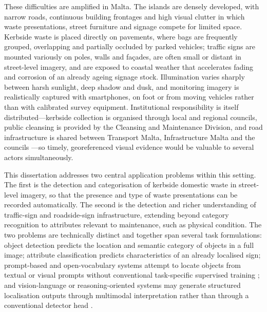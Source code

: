These difficulties are amplified in Malta. The islands are densely developed, with narrow roads, continuous building frontages and high visual clutter in which waste presentations, street furniture and signage compete for limited space. Kerbside waste is placed directly on pavements, where bags are frequently grouped, overlapping and partially occluded by parked vehicles; traffic signs are mounted variously on poles, walls and fa\c{c}ades, are often small or distant in street-level imagery, and are exposed to coastal weather that accelerates fading and corrosion of an already ageing signage stock. Illumination varies sharply between harsh sunlight, deep shadow and dusk, and monitoring imagery is realistically captured with smartphones, on foot or from moving vehicles rather than with calibrated survey equipment. Institutional responsibility is itself distributed---kerbside collection is organised through local and regional councils, public cleansing is provided by the Cleansing and Maintenance Division, and road infrastructure is shared between Transport Malta, Infrastructure Malta and the councils \citep{wastecollection2026web,cmd2026web,localcouncilsact1993}---so timely, georeferenced visual evidence would be valuable to several actors simultaneously.

This dissertation addresses two central application problems within this setting. The first is the detection and categorisation of kerbside domestic waste in street-level imagery, so that the presence and type of waste presentations can be recorded automatically. The second is the detection and richer understanding of traffic-sign and roadside-sign infrastructure, extending beyond category recognition to attributes relevant to maintenance, such as physical condition. The two problems are technically distinct and together span several task formulations: object detection predicts the location and semantic category of objects in a full image; attribute classification predicts characteristics of an already localised sign; prompt-based and open-vocabulary systems attempt to locate objects from textual or visual prompts without conventional task-specific supervised training \citep{kirillov2023segment}; and vision-language or reasoning-oriented systems may generate structured localisation outputs through multimodal interpretation rather than through a conventional detector head \citep{nvidia2025cosmosplatform}.

